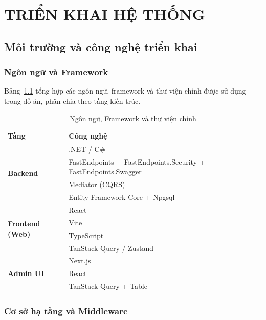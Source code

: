 \chapter{TRIỂN KHAI HỆ THỐNG}
\label{chap:trien_khai}

\section{Môi trường và công nghệ triển khai}
\label{sec:moi_truong_cong_nghe}

\subsection{Ngôn ngữ và Framework}
\label{subsec:ngon_ngu_framework}

Bảng~\ref{tab:lang_framework} tổng hợp các ngôn ngữ, framework và thư viện chính được sử dụng trong đồ án, phân chia theo tầng kiến trúc.

\begin{table}[H]
\centering
\caption{Ngôn ngữ, Framework và thư viện chính}
\label{tab:lang_framework}
\renewcommand{\arraystretch}{1.3}
\begin{tabularx}{\textwidth}{|l|X|}
\hline
\textbf{Tầng} & \textbf{Công nghệ} \\
\hline
\multirow{4}{*}{\textbf{Backend}} & .NET / C\# \\
 & FastEndpoints + FastEndpoints.Security + FastEndpoints.Swagger \\
 & Mediator (CQRS) \\
 & Entity Framework Core + Npgsql \\
\hline
\multirow{4}{*}{\textbf{Frontend (Web)}} & React \\
 & Vite \\
 & TypeScript \\
 & TanStack Query / Zustand \\
\hline
\multirow{3}{*}{\textbf{Admin UI}} & Next.js \\
 & React \\
 & TanStack Query + Table \\
\hline
\end{tabularx}
\end{table}

\subsection{Cơ sở hạ tầng và Middleware}
\label{subsec:co_so_ha_tang}

